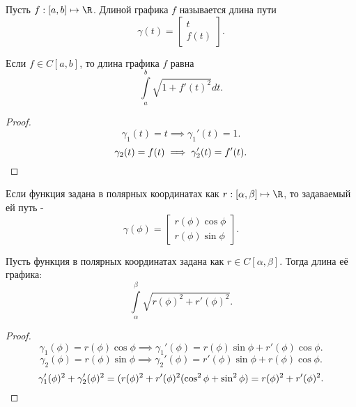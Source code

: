 \begin{definition} \thmslashn 

    Пусть $f : [a, b] \mapsto \R$. Длиной графика $f$ называется длина пути 
    \[ \gamma(t) = \begin{bmatrix} t\\ f(t) \end{bmatrix}  .\] 
\end{definition}
\begin{consequence} \thmslashn

    Если $f\in C[a, b]$, то длина графика $f$ равна
    \[ \int\limits_{a}^{b} \sqrt{1 + f'(t)^2}dt    .\] 
    \begin{proof} \thmslashn
    
        \[ \gamma_1(t) = t \implies \gamma_1'(t) = 1 .\]
        \[ \gamma_2(t) = f(t) \implies \gamma_2'(t) = f'(t).\qedhere\] 
    \end{proof}
\end{consequence}
\begin{definition} \thmslashn 

    Если функция задана в полярных координатах как $r : [\alpha, \beta] \mapsto \R$, то задаваемый ей путь - 
    \[ \gamma(\phi) = \begin{bmatrix} r(\phi)\cos \phi\\ r(\phi)\sin \phi \end{bmatrix}  .\] 
\end{definition}
\begin{consequence} \thmslashn

    Пусть функция в полярных координатах задана как  $r\in C[\alpha, \beta]$. Тогда длина её графика:
    \[ \int\limits_{\alpha}^{\beta} \sqrt{r(\phi)^2 + r'(\phi)^2}   .\]
    \begin{proof} \thmslashn
    
        \[ \gamma_1(\phi) = r(\phi)\cos \phi \implies \gamma_1'(\phi) = r(\phi)\sin \phi + r'(\phi)\cos \phi .\] 
        \[ \gamma_2(\phi) = r(\phi)\sin \phi \implies \gamma_2'(\phi) = r'(\phi)\sin \phi + r(\phi)\cos \phi .\]
        \[ \gamma_1'(\phi)^2 + \gamma_2'(\phi)^2 = (r(\phi)^2 + r'(\phi)^2(\cos^2 \phi +\sin^2 \phi) = r(\phi)^2 + r'(\phi)^2.\qedhere\] 
    \end{proof}
\end{consequence}
